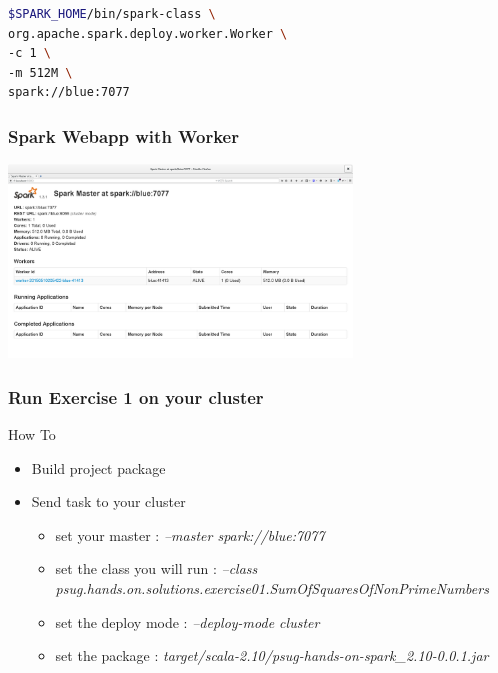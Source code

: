 \documentclass[slidetop,9pt,utf8]{beamer}
\begin{document}
\begin{CJK}{UTF8}{gbsn}
\begin{frame}[fragile]
  \begin{lstlisting}[language=bash, style=terminal-large]
$SPARK_HOME/bin/spark-class \
org.apache.spark.deploy.worker.Worker \
-c 1 \
-m 512M \
spark://blue:7077
  \end{lstlisting} 

\end{frame}

\begin{frame}

  \frametitle{Spark Webapp with Worker}

  \includegraphics[width=345px]{images/spark_webapp_with_worker.png}

\end{frame}

\begin{frame}[fragile]

  \frametitle{Run Exercise 1 on your cluster}

  \begin{block}{How To}
    \begin{itemize}
      \item Build project package
      \item Send task to your cluster
      \begin{itemize}
        \item set your master : \textit{--master spark://blue:7077}
        \item set the class you will run : \textit{--class psug.hands.on.solutions.exercise01.SumOfSquaresOfNonPrimeNumbers}
        \item set the deploy mode : \textit{--deploy-mode cluster}
        \item set the package : \textit{target/scala-2.10/psug-hands-on-spark\_2.10-0.0.1.jar}
      \end{itemize}
    \end{itemize}
  \end{block}


\end{frame}
\end{CJK}
\end{document}
